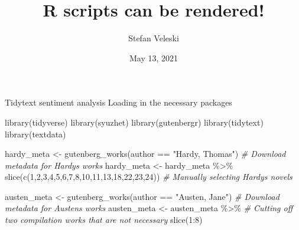 \documentclass[
]{article}
\title{R scripts can be rendered!}
\author{Stefan Veleski}
\date{May 13, 2021}
\newenvironment{Shaded}{\begin{snugshade}}{\end{snugshade}}
\newcommand{\CommentTok}[1]{\textcolor[rgb]{0.56,0.35,0.01}{\textit{#1}}}
\newcommand{\DecValTok}[1]{\textcolor[rgb]{0.00,0.00,0.81}{#1}}
\newcommand{\FunctionTok}[1]{\textcolor[rgb]{0.00,0.00,0.00}{#1}}
\newcommand{\NormalTok}[1]{#1}
\newcommand{\OtherTok}[1]{\textcolor[rgb]{0.56,0.35,0.01}{#1}}
\newcommand{\SpecialCharTok}[1]{\textcolor[rgb]{0.00,0.00,0.00}{#1}}
\newcommand{\StringTok}[1]{\textcolor[rgb]{0.31,0.60,0.02}{#1}}
\begin{document}
\maketitle

Tidytext sentiment analysis Loading in the necessary packages

\begin{Shaded}
\begin{Highlighting}[]
\FunctionTok{library}\NormalTok{(tidyverse)}
\FunctionTok{library}\NormalTok{(syuzhet)}
\FunctionTok{library}\NormalTok{(gutenbergr)}
\FunctionTok{library}\NormalTok{(tidytext)}
\FunctionTok{library}\NormalTok{(textdata)}
\end{Highlighting}
\end{Shaded}

\begin{Shaded}
\begin{Highlighting}[]
\NormalTok{hardy\_meta }\OtherTok{\textless{}{-}} \FunctionTok{gutenberg\_works}\NormalTok{(author }\SpecialCharTok{==} \StringTok{"Hardy, Thomas"}\NormalTok{) }\CommentTok{\# Download metadata for Hardy\textquotesingle{}s works}
\NormalTok{hardy\_meta }\OtherTok{\textless{}{-}}\NormalTok{ hardy\_meta }\SpecialCharTok{\%\textgreater{}\%} 
  \FunctionTok{slice}\NormalTok{(}\FunctionTok{c}\NormalTok{(}\DecValTok{1}\NormalTok{,}\DecValTok{2}\NormalTok{,}\DecValTok{3}\NormalTok{,}\DecValTok{4}\NormalTok{,}\DecValTok{5}\NormalTok{,}\DecValTok{6}\NormalTok{,}\DecValTok{7}\NormalTok{,}\DecValTok{8}\NormalTok{,}\DecValTok{10}\NormalTok{,}\DecValTok{11}\NormalTok{,}\DecValTok{13}\NormalTok{,}\DecValTok{18}\NormalTok{,}\DecValTok{22}\NormalTok{,}\DecValTok{23}\NormalTok{,}\DecValTok{24}\NormalTok{)) }\CommentTok{\# Manually selecting Hardy\textquotesingle{}s novels}
\end{Highlighting}
\end{Shaded}

\begin{Shaded}
\begin{Highlighting}[]
\NormalTok{austen\_meta }\OtherTok{\textless{}{-}} \FunctionTok{gutenberg\_works}\NormalTok{(author }\SpecialCharTok{==} \StringTok{"Austen, Jane"}\NormalTok{) }\CommentTok{\# Download metadata for Austen\textquotesingle{}s works}
\NormalTok{austen\_meta }\OtherTok{\textless{}{-}}\NormalTok{ austen\_meta }\SpecialCharTok{\%\textgreater{}\%}  \CommentTok{\# Cutting off two compilation works that are not necessary }
  \FunctionTok{slice}\NormalTok{(}\DecValTok{1}\SpecialCharTok{:}\DecValTok{8}\NormalTok{)}
\end{Highlighting}
\end{Shaded}
\end{document}
